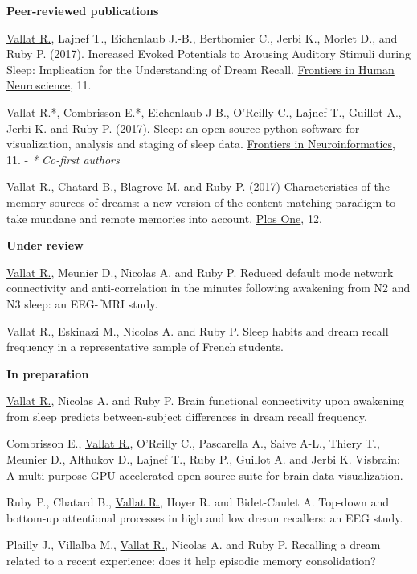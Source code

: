 \label{sec:publications}
\vspace*{-10mm}

\textbf{Peer-reviewed publications}

\underline{Vallat R.}, Lajnef T., Eichenlaub J.-B., Berthomier C., Jerbi K., Morlet D., and Ruby P. (2017). Increased Evoked Potentials to Arousing Auditory Stimuli during Sleep: Implication for the Understanding of Dream Recall. \href{https://doi.org/10.3389/fnhum.2017.00132}{Frontiers in Human Neuroscience}, 11.

\underline{Vallat R.*}, Combrisson E.*, Eichenlaub J-B., O'Reilly C., Lajnef T., Guillot A., Jerbi K. and Ruby P. (2017). Sleep: an open-source python software for visualization, analysis and staging of sleep data. \href{https://doi.org/10.3389/fninf.2017.00060}{Frontiers in Neuroinformatics}, 11. - \emph{* Co-first authors}

\underline{Vallat R.}, Chatard B., Blagrove M. and Ruby P. (2017) Characteristics of the memory sources of dreams: a new version
of the content-matching paradigm to take mundane and remote memories into account. \href{https://doi.org/10.1371/journal.pone.0185262}{Plos One}, 12. 

\textbf{Under review}

\underline{Vallat R.}, Meunier D., Nicolas A. and Ruby P. Reduced default mode network connectivity and anti-correlation in the minutes following awakening from N2 and N3 sleep: an EEG-fMRI study.

\underline{Vallat R.}, Eskinazi M., Nicolas A. and Ruby P. Sleep habits and dream recall frequency in a representative sample
of French students.

\textbf{In preparation}

\underline{Vallat R.}, Nicolas A. and Ruby P. Brain functional connectivity upon awakening from sleep predicts between-subject differences in dream recall frequency.

Combrisson E., \underline{Vallat R.}, O'Reilly C., Pascarella A., Saive A-L., Thiery T., Meunier D., Althukov D., Lajnef T., Ruby P., Guillot A. and Jerbi K. Visbrain: A multi-purpose GPU-accelerated open-source suite for brain data visualization.

Ruby P., Chatard B., \underline{Vallat R.}, Hoyer R. and Bidet-Caulet A. Top-down and bottom-up attentional processes in high and low dream recallers: an EEG study.

Plailly J., Villalba M., \underline{Vallat R.}, Nicolas A. and Ruby P. Recalling a dream related to a recent experience: does it help episodic memory consolidation?
